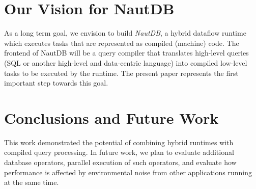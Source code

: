 \documentclass[conference]{IEEEtran}
\begin{document}
\section{Our Vision for NautDB}
\label{sec:our-vision-nautdb}

As a long term goal, we envision to build \emph{NautDB}, a hybrid dataflow runtime which executes tasks that are represented as compiled (machine) code. The frontend of NautDB will be a query compiler that translates high-level queries (SQL or another  high-level and data-centric language) into compiled low-level tasks to be executed by the runtime. The present paper represents the first important step towards this goal.


\section{Conclusions and Future Work}
\label{sec:concl-future-work}

This work demonstrated the potential of combining hybrid runtimes with compiled query processing. In future work, we plan to evaluate additional database operators, parallel execution of such operators, and evaluate how performance is affected by environmental noise from other applications running at the same time.

  
  
\end{document}
